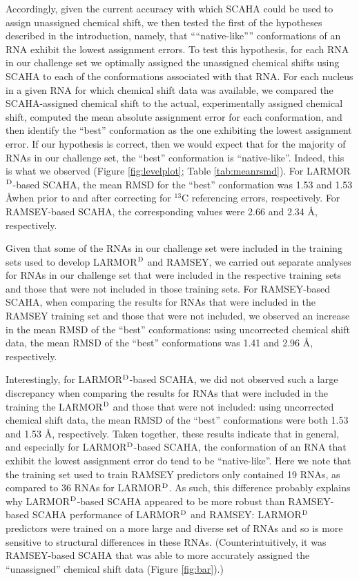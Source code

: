 \documentclass[journal=jcisd8,manuscript=article,layout=onecolumn]{achemso}
\begin{document}
Accordingly, given the current accuracy with which SCAHA could be used to assign unassigned chemical shift, we then tested the first of the hypotheses described in the introduction, namely, that “``native-like''” conformations of an RNA exhibit the lowest assignment errors. To test this hypothesis, for each RNA in our challenge set we optimally assigned the unassigned chemical shifts using SCAHA to each of the conformations associated with that RNA. For each nucleus in a given RNA for which chemical shift data was available, we compared the SCAHA-assigned chemical shift to the actual, experimentally assigned chemical shift, computed the mean absolute assignment error for each conformation, and then identify the ``best'' conformation as the one exhibiting the lowest assignment error. If our hypothesis is correct, then we would expect that for the majority of RNAs in our challenge set, the ``best'' conformation is ``native-like''. Indeed, this is what we observed (Figure \ref{fig:levelplot}; Table \ref{tab:meanrsmd}). For LARMOR$^{\rm D}$-based SCAHA, the mean RMSD for the ``best'' conformation was 1.53 and 1.53 \AA when prior to and after correcting for $^{13}$C referencing errors, respectively. For  RAMSEY-based SCAHA, the corresponding values were 2.66 and 2.34 \AA, respectively.

Given that some of the RNAs in our challenge set were included in the training sets used to develop LARMOR$^{\rm D}$ and RAMSEY, we carried out separate analyses for RNAs in our challenge set that were included in the respective training sets and those that were not included in those training sets. For RAMSEY-based SCAHA,  when comparing the results for RNAs that were included in the RAMSEY training set and those that were not included, we observed an increase in the mean RMSD of the ``best'' conformations: using uncorrected chemical shift data, the mean RMSD of the ``best'' conformations was 1.41 and 2.96 \AA, respectively. 

Interestingly, for LARMOR$^{\rm D}$-based SCAHA,  we did not observed such a large discrepancy when comparing the results for RNAs that were included in the training the LARMOR$^{\rm D}$ and those that were not included: using uncorrected chemical shift data, the mean RMSD of the ``best'' conformations were both 1.53 and 1.53 \AA, respectively. Taken together, these results indicate that in general, and especially for LARMOR$^{\rm D}$-based SCAHA, the conformation of an RNA that exhibit the lowest assignment error do tend to be ``native-like''. Here we note that the training set used to train RAMSEY predictors only contained 19 RNAs, as compared to 36 RNAs for LARMOR$^{\rm D}$. As such, this difference probably explains why LARMOR$^{\rm D}$-based SCAHA appeared to be more robust than RAMSEY-based SCAHA performance of LARMOR$^{\rm D}$ and RAMSEY: LARMOR$^{\rm D}$ predictors were trained on a more large and diverse set of RNAs and so is more sensitive to structural differences in these RNAs. (Counterintuitively, it was RAMSEY-based SCAHA that was able to more accurately assigned the ``unassigned'' chemical shift data (Figure \ref{fig:bar}).)
\end{document}

